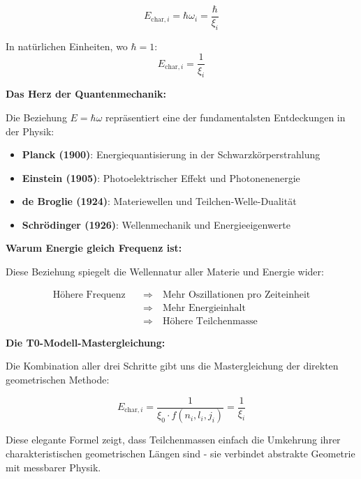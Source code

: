 \documentclass[12pt,a4paper]{article}
\begin{document}
	\begin{equation}
		E_{\text{char},i} = \hbar \omega_i = \frac{\hbar}{\xi_i}
		\label{eq:energy_from_frequency}
	\end{equation}
	
	In natürlichen Einheiten, wo $\hbar = 1$:
	\begin{equation}
		\boxed{E_{\text{char},i} = \frac{1}{\xi_i}}
		\label{eq:characteristic_energy_direct}
	\end{equation}
	
	\textbf{Das Herz der Quantenmechanik:}
	
	Die Beziehung $E = \hbar \omega$ repräsentiert eine der fundamentalsten Entdeckungen in der Physik:
	
	\begin{itemize}
		\item \textbf{Planck (1900)}: Energiequantisierung in der Schwarzkörperstrahlung
		\item \textbf{Einstein (1905)}: Photoelektrischer Effekt und Photonenenergie
		\item \textbf{de Broglie (1924)}: Materiewellen und Teilchen-Welle-Dualität
		\item \textbf{Schrödinger (1926)}: Wellenmechanik und Energieeigenwerte
	\end{itemize}
	
	\textbf{Warum Energie gleich Frequenz ist:}
	
	Diese Beziehung spiegelt die Wellennatur aller Materie und Energie wider:
	
	\begin{align}
		\text{Höhere Frequenz} \quad &\Rightarrow \quad \text{Mehr Oszillationen pro Zeiteinheit} \\
		&\Rightarrow \quad \text{Mehr Energieinhalt} \\
		&\Rightarrow \quad \text{Höhere Teilchenmasse}
	\end{align}
	
	\textbf{Die T0-Modell-Mastergleichung:}
	
	Die Kombination aller drei Schritte gibt uns die Mastergleichung der direkten geometrischen Methode:
	
	\begin{equation}
		\boxed{E_{\text{char},i} = \frac{1}{\xi_0 \cdot f(n_i, l_i, j_i)} = \frac{1}{\xi_i}}
		\label{eq:master_equation_direct}
	\end{equation}
	
	Diese elegante Formel zeigt, dass Teilchenmassen einfach die Umkehrung ihrer charakteristischen geometrischen Längen sind - sie verbindet abstrakte Geometrie mit messbarer Physik.
	
\end{document}
